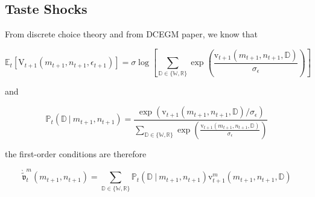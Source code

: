 \documentclass{article}
\newcommand{\VFunc}{\mathrm{V}}
\newcommand{\Ex}{\mathbb{E}}
\newcommand{\vFunc}{\mathrm{v}}
\newcommand{\mRat}{m}
\newcommand{\vOptAlt}{\grave{\tilde{\mathfrak{v}}}}
\newcommand{\nRat}{n}
\newcommand{\Retire}{\mathbb{R}}
\newcommand{\Work}{\mathbb{W}}
\newcommand{\error}{\epsilon}
\newcommand{\Decision}{\mathbb{D}}
\newcommand{\Prob}{\mathbb{P}}
\begin{document}
\subsection{Taste Shocks}\label{Taste Shocks}

From discrete choice theory and from DCEGM paper, we know that

\begin{equation}
\Ex_{t} \left[
        \VFunc_{t+1}(\mRat_{t+1}, \nRat_{t+1}, \error_{t+1}) \right] =
    \sigma \log \left[ \sum_{\Decision \in \{\Work, \Retire\}} \exp \left(
        \frac{\vFunc_{t+1}(\mRat_{t+1}, \nRat_{t+1},
            \Decision)}{\sigma_\error} \right)  \right]
\end{equation}

and

\begin{equation}
\Prob_{t}(\Decision ~ \lvert ~ \mRat_{t+1}, \nRat_{t+1}) = \frac{\exp
        \left(
        \vFunc_{t + 1}(\mRat_{t+1}, \nRat_{t+1}, \Decision) /
        \sigma_\error
        \right)
    }{  \sum\limits_{\Decision \in \{\Work, \Retire\}} \exp \left(
        \frac{\vFunc_{t+1}(\mRat_{t+1}, \nRat_{t+1},
            \Decision)}{\sigma_\error} \right)}
\end{equation}

the first-order conditions are therefore

\begin{equation}
\vOptAlt_{t}^{\mRat}(\mRat_{t+1}, \nRat_{t+1}) = \sum_{\Decision \in
        \{\Work, \Retire\}} \Prob_{t}(\Decision ~
    \lvert ~
    \mRat_{t+1}, \nRat_{t+1}) \vFunc_{t+1}^{\mRat}(\mRat_{t+1},
    \nRat_{t+1},
    \Decision)
\end{equation}



        
    
\end{document}
